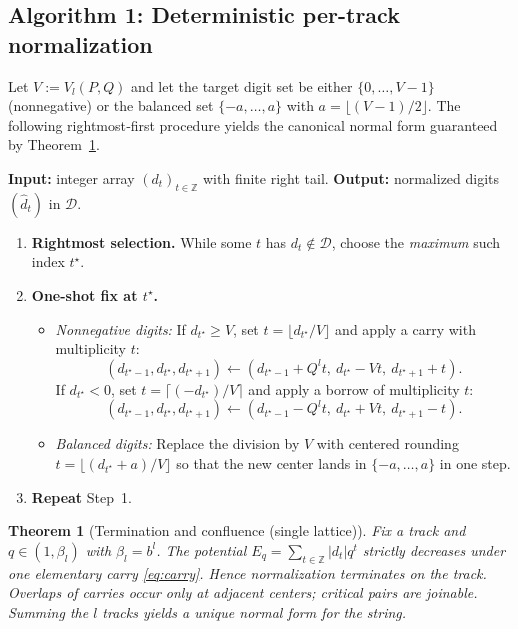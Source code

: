 \documentclass[11pt]{article}
\newtheorem{theorem}{Theorem}[section]
\theoremstyle{definition}
\theoremstyle{remark}
\newcommand{\Z}{\mathbb{Z}}
\begin{document}
\subsection*{Algorithm 1: Deterministic per-track normalization}
Let $V:=V_l(P,Q)$ and let the target digit set be either $\{0,\dots,V-1\}$ (nonnegative) or the balanced set $\{-a,\dots,a\}$ with $a=\lfloor(V-1)/2\rfloor$. The following rightmost‑first procedure yields the canonical normal form guaranteed by Theorem~\ref{thm:terminate}.

\medskip
\noindent\textbf{Input:} integer array $(d_t)_{t\in\Z}$ with finite right tail. \quad
\textbf{Output:} normalized digits $(\hat d_t)$ in $\mathcal D$.

\begin{enumerate}
\item \textbf{Rightmost selection.} While some $t$ has $d_t\notin\mathcal D$, choose the \emph{maximum} such index $t^\star$.
\item \textbf{One-shot fix at $t^\star$.}
\begin{itemize}
  \item \emph{Nonnegative digits:} If $d_{t^\star}\ge V$, set $t=\big\lfloor d_{t^\star}/V\big\rfloor$ and apply a carry with multiplicity $t$:
  \[
  (d_{t^\star-1},d_{t^\star},d_{t^\star+1}) \leftarrow (d_{t^\star-1}+Q^l t,\ d_{t^\star}-Vt,\ d_{t^\star+1}+t).
  \]
  If $d_{t^\star}<0$, set $t=\big\lceil(-d_{t^\star})/V\big\rceil$ and apply a borrow of multiplicity $t$:
  \[
  (d_{t^\star-1},d_{t^\star},d_{t^\star+1}) \leftarrow (d_{t^\star-1}-Q^l t,\ d_{t^\star}+Vt,\ d_{t^\star+1}-t).
  \]
  \item \emph{Balanced digits:} Replace the division by $V$ with centered rounding $t=\big\lfloor (d_{t^\star}+a)/V\big\rfloor$ so that the new center lands in $\{-a,\dots,a\}$ in one step.
\end{itemize}
\item \textbf{Repeat} Step~1.
\end{enumerate}

\begin{theorem}[Termination and confluence (single lattice)]\label{thm:terminate}
Fix a track and $q\in(1,\beta_l)$ with $\beta_l=b^l$. The potential $E_q=\sum_{t\in\Z}|d_t|q^t$ strictly decreases under one elementary carry \eqref{eq:carry}. Hence normalization terminates on the track. Overlaps of carries occur only at adjacent centers; critical pairs are joinable. Summing the $l$ tracks yields a unique normal form for the string.
\end{theorem}
\end{document}
